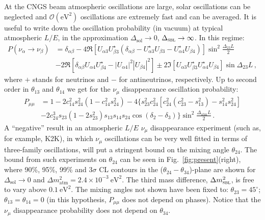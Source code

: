 \documentclass[12pt]{elsart}
\newcommand{\eVq}{\ensuremath{\text{eV}^2}}
\newcommand{\Dmq}{\Delta m^2}
\newcommand{\Sol}{\text{sol}}
\newcommand{\Atm}{\text{atm}}
\newcommand{\Sbl}{\textsc{sbl}}
\begin{document}
At the CNGS beam atmospheric oscillations are large, solar
oscillations can be neglected and $\mathcal{O}(\eVq)$ oscillations are
extremely fast and can be averaged.  It is useful to write down the
oscillation probability (in vacuum) at typical atmospheric $L/E$, in
the approximation $\Delta_\Sol \to 0$, $\Delta_\Sbl \to \infty$. In
this regime:
%
\begin{equation} \begin{split}
    P(\nu_\alpha \to \nu_\beta) &= \delta_{\alpha \beta}
    - 4 \Re \left[ U_{\alpha 3} U^\star_{\beta 3} \left(
    \delta_{\alpha\beta} - U^\star_{\alpha 3} U_{\beta 3}
    - U^\star_{\alpha 4} U_{\beta 4} \right) \right]
    \sin^2 \frac{\Delta_{23} L }{2}
    \\
    &- 2 \Re \left[ \delta_{\alpha\beta} U_{\alpha 4} U^\star_{\beta 4}
    - |U_{\alpha 4}|^2 |U_{\beta 4}|^2 \right]
    \pm 2 \Im \left[ U_{\alpha 3} U^\star_{\beta 3}
    U^\star_{\alpha 4} U_{\beta 4} \right] \sin \Delta_{23} L \,,
\end{split} \end{equation}
%
where $+$ stands for neutrinos and $-$ for antineutrinos,
respectively. Up to second order in $\theta_{13}$ and $\theta_{14}$ we
get for the $\nu_\mu$ disappearance oscillation probability:
%
\begin{equation} \begin{split}
    P_{\mu\mu} &= 1 - 2 c^2_{14} s^2_{24} (1 - c^2_{14} s^2_{24})
    - 4 \big\lbrace s^2_{23} c^2_{24} \left[ c^2_{24} (c^2_{23}
    - s^2_{13}) - s^2_{14} s^2_{24} \right]
    \\    
    &- 2 c^3_{24} s_{23} (1 - 2 s^2_{23}) s_{13} s_{14} s_{24}
    \cos(\delta_2 - \delta_3) \big\rbrace
    \sin^2 \frac{\Delta_\Atm L }{2} \,.
\end{split} \end{equation}
%
A ``negative'' result in an atmospheric $L/E$ $\nu_\mu$ disappearance
experiment (such as, for example, K2K), in which $\nu_\mu$
oscillations can be very well fitted in terms of three-family
oscillations, will put a stringent bound on the mixing angle
$\theta_{24}$.  The bound from such experiments on $\theta_{24}$ can
be seen in Fig.~\ref{fig:present}(right), where 90\%, 95\%, 99\% and
3$\sigma$ CL contours in the ($\theta_{24}-\theta_{34}$)-plane are
shown for $\Delta_\Sol \to 0$ and $\Dmq_\Atm = 2.4 \times
10^{-3}~\eVq$.  The third mass difference, $\Dmq_\Sbl$, is free to
vary above $0.1~\eVq$. The mixing angles not shown have been fixed to:
$\theta_{23} = 45^\circ$; $\theta_{13} = \theta_{14} = 0$ (in this
hypothesis, $P_{\mu \mu}$ does not depend on phases).  Notice that the
$\nu_\mu$ disappearance probability does not depend on $\theta_{34}$. 
\end{document}
